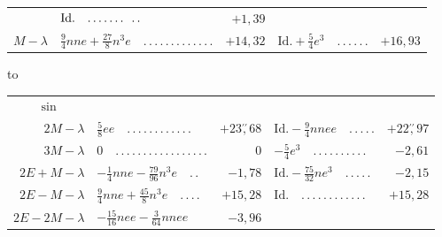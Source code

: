 \begin{landscape}
\begin{longtable}{r|p{7.8cm}r@{\quad}p{4.3cm}r}
&\(\text{Id.}\quad \mathord{.}\,\mathord{.}\,\mathord{.}\,\mathord{.}\,\mathord{.}\,\mathord{.}\,\mathord{.}\hspace{.65em}\mathord{.}\,\mathord{.}\)&\(+1{,}39\)\\
\(M-\lambda\)&\(\tfrac94nne+\tfrac{27}{8}n^3e\quad \mathord{.}\,\mathord{.}\,\mathord{.}\,\mathord{.}\,\mathord{.}\,\mathord{.}\,\mathord{.}\,\mathord{.}\,\mathord{.}\,\mathord{.}\,\mathord{.}\,\mathord{.}\,\mathord{.}\)&\(+14{,}32\)
&\(\text{Id.}+\tfrac54e^3\quad \mathord{.}\,\mathord{.}\,\mathord{.}\,\mathord{.}\,\mathord{.}\,\mathord{.}\)&\(+16{,}93\)
\end{longtable}
\thispagestyle{VIIPrinted633}
\nointerlineskip
\hbox to
\begin{longtable}{r|p{7.8cm}r@{\quad}p{4.3cm}r}
\multicolumn{1}{c}{\(\sin\)}&&&&\\
\(2M-\lambda\)&\(\tfrac58ee\quad \mathord{.}\,\mathord{.}\,\mathord{.}\,\mathord{.}\,\mathord{.}\,\mathord{.}\,\mathord{.}\,\mathord{.}\,\mathord{.}\,\mathord{.}\,\mathord{.}\,\mathord{.}\)&\(+23\overset{\prime\prime}{,}68\)
&\(\text{Id.}-\tfrac94nnee\quad \mathord{.}\,\mathord{.}\,\mathord{.}\,\mathord{.}\,\mathord{.}\)&\(+22\overset{\prime\prime}{,}97\)\\
\(3M-\lambda\)&\(0\quad \mathord{.}\,\mathord{.}\,\mathord{.}\,\mathord{.}\,\mathord{.}\,\mathord{.}\,\mathord{.}\,\mathord{.}\,\mathord{.}\,\mathord{.}\,\mathord{.}\,\mathord{.}\,\mathord{.}\,\mathord{.}\,\mathord{.}\,\mathord{.}\,\mathord{.}\)&\(0\)
&\(-\tfrac54e^3\quad \mathord{.}\,\mathord{.}\,\mathord{.}\,\mathord{.}\,\mathord{.}\,\mathord{.}\,\mathord{.}\,\mathord{.}\,\mathord{.}\,\mathord{.}\)&\(-2{,}61\)\\
\(2E+M-\lambda\)&\(-\tfrac14nne-\tfrac{79}{96}n^3e\quad \mathord{.}\,\mathord{.}\)&\(-1{,}78\)
&\(\text{Id.}-\tfrac{75}{32}ne^3\quad \mathord{.}\,\mathord{.}\,\mathord{.}\,\mathord{.}\,\mathord{.}\)&\(-2{,}15\)\\
\(2E-M-\lambda\)&\(\tfrac94nne+\tfrac{45}{8}n^3e\quad \mathord{.}\,\mathord{.}\,\mathord{.}\,\mathord{.}\)&\(+15{,}28\)
&\(\text{Id.}\quad \mathord{.}\,\mathord{.}\,\mathord{.}\,\mathord{.}\,\mathord{.}\,\mathord{.}\,\mathord{.}\,\mathord{.}\,\mathord{.}\,\mathord{.}\,\mathord{.}\,\mathord{.}\)&\(+15{,}28\)\\
\(2E-2M-\lambda\)&\(-\tfrac{15}{16}nee-\tfrac{3}{64}nnee\)&\(-3{,}96\)

\end{longtable}
\end{landscape}
